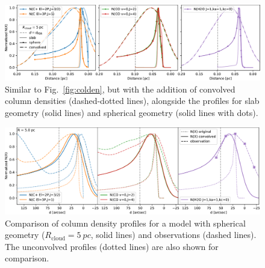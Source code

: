 \documentclass[12pt,a4paper]{article}
\newcommand{\mr}{\mathrm}
\begin{document}
\begin{figure}
    \centering
    \includegraphics[width=\textwidth,keepaspectratio]{convolved_column_densities.pdf}
    \caption{Similar to Fig.~\ref{fig:colden}, but with the addition of convolved column densities (dashed-dotted lines), alongside the profiles for slab geometry (solid lines) and spherical geometry (solid lines with dots).} \label{fig:convvcolden}
\end{figure}

\begin{figure}
    \centering
    \includegraphics[width=\textwidth,keepaspectratio]{colden_Rcloud5pc.pdf}
    \caption{Comparison of column density profiles for a model with spherical geometry ($R_\mr{cloud} = \qty{5}{pc}$, solid lines) and observations (dashed lines). The unconvolved profiles (dotted lines) are also shown for comparison.} \label{fig:colden_Rcloud5pc}
\end{figure}
\end{document}
